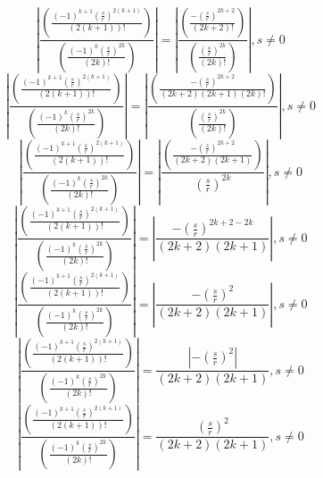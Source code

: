 \documentclass[a4paper,12pt]{report}
\begin{document}
\begin{equation}
\left|\frac{\left(\frac{(-1)^{k+1} \left(\frac{s}{r}\right)^{2(k+1)}}{(2(k+1))!}\right)}{\left(\frac{(-1)^k \left(\frac{s}{r}\right)^{2k}}{(2k)!}\right)}\right| = \left|\frac{\left(\frac{-\left(\frac{s}{r}\right)^{2k+2}}{(2k+2)!}\right)}{\left(\frac{\left(\frac{s}{r}\right)^{2k}}{(2k)!}\right)}\right|, s \neq 0
\end{equation}
\begin{equation}
\left|\frac{\left(\frac{(-1)^{k+1} \left(\frac{s}{r}\right)^{2(k+1)}}{(2(k+1))!}\right)}{\left(\frac{(-1)^k \left(\frac{s}{r}\right)^{2k}}{(2k)!}\right)}\right| = \left|\frac{\left(\frac{-\left(\frac{s}{r}\right)^{2k+2}}{(2k+2)(2k+1)(2k)!}\right)}{\left(\frac{\left(\frac{s}{r}\right)^{2k}}{(2k)!}\right)}\right|, s \neq 0
\end{equation}
\begin{equation}
\left|\frac{\left(\frac{(-1)^{k+1} \left(\frac{s}{r}\right)^{2(k+1)}}{(2(k+1))!}\right)}{\left(\frac{(-1)^k \left(\frac{s}{r}\right)^{2k}}{(2k)!}\right)}\right| = \left|\frac{\left(\frac{-\left(\frac{s}{r}\right)^{2k+2}}{(2k+2)(2k+1)}\right)}{\left(\frac{s}{r}\right)^{2k}}\right|, s \neq 0
\end{equation}
\begin{equation}
\left|\frac{\left(\frac{(-1)^{k+1} \left(\frac{s}{r}\right)^{2(k+1)}}{(2(k+1))!}\right)}{\left(\frac{(-1)^k \left(\frac{s}{r}\right)^{2k}}{(2k)!}\right)}\right| = \left|\frac{-\left(\frac{s}{r}\right)^{2k+2-2k}}{(2k+2)(2k+1)}\right|, s \neq 0
\end{equation}
\begin{equation}
\left|\frac{\left(\frac{(-1)^{k+1} \left(\frac{s}{r}\right)^{2(k+1)}}{(2(k+1))!}\right)}{\left(\frac{(-1)^k \left(\frac{s}{r}\right)^{2k}}{(2k)!}\right)}\right| = \left|\frac{-\left(\frac{s}{r}\right)^2}{(2k+2)(2k+1)}\right|, s \neq 0
\end{equation}
\begin{equation}
\left|\frac{\left(\frac{(-1)^{k+1} \left(\frac{s}{r}\right)^{2(k+1)}}{(2(k+1))!}\right)}{\left(\frac{(-1)^k \left(\frac{s}{r}\right)^{2k}}{(2k)!}\right)}\right| = \frac{\left|-\left(\frac{s}{r}\right)^2\right|}{(2k+2)(2k+1)}, s \neq 0
\end{equation}
\begin{equation}
\left|\frac{\left(\frac{(-1)^{k+1} \left(\frac{s}{r}\right)^{2(k+1)}}{(2(k+1))!}\right)}{\left(\frac{(-1)^k \left(\frac{s}{r}\right)^{2k}}{(2k)!}\right)}\right| = \frac{\left(\frac{s}{r}\right)^2}{(2k+2)(2k+1)}, s \neq 0
\end{equation}
\end{document}

